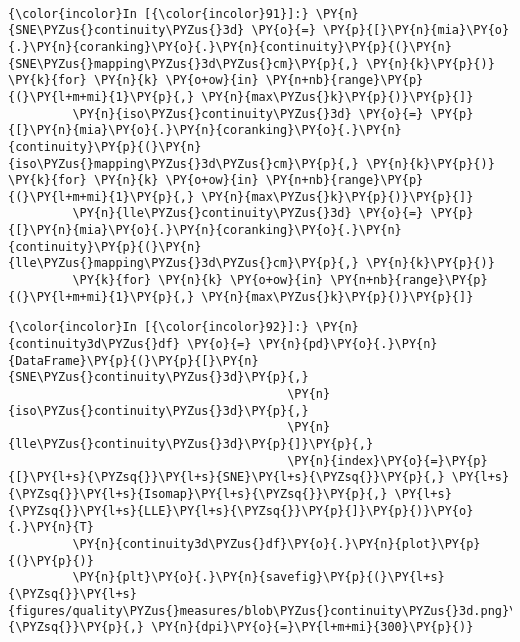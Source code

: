     \begin{center}
    \end{center}
    { \hspace*{\fill} \\}

    \begin{Verbatim}[commandchars=\\\{\}]
{\color{incolor}In [{\color{incolor}91}]:} \PY{n}{SNE\PYZus{}continuity\PYZus{}3d} \PY{o}{=} \PY{p}{[}\PY{n}{mia}\PY{o}{.}\PY{n}{coranking}\PY{o}{.}\PY{n}{continuity}\PY{p}{(}\PY{n}{SNE\PYZus{}mapping\PYZus{}3d\PYZus{}cm}\PY{p}{,} \PY{n}{k}\PY{p}{)} \PY{k}{for} \PY{n}{k} \PY{o+ow}{in} \PY{n+nb}{range}\PY{p}{(}\PY{l+m+mi}{1}\PY{p}{,} \PY{n}{max\PYZus{}k}\PY{p}{)}\PY{p}{]}
         \PY{n}{iso\PYZus{}continuity\PYZus{}3d} \PY{o}{=} \PY{p}{[}\PY{n}{mia}\PY{o}{.}\PY{n}{coranking}\PY{o}{.}\PY{n}{continuity}\PY{p}{(}\PY{n}{iso\PYZus{}mapping\PYZus{}3d\PYZus{}cm}\PY{p}{,} \PY{n}{k}\PY{p}{)} \PY{k}{for} \PY{n}{k} \PY{o+ow}{in} \PY{n+nb}{range}\PY{p}{(}\PY{l+m+mi}{1}\PY{p}{,} \PY{n}{max\PYZus{}k}\PY{p}{)}\PY{p}{]}
         \PY{n}{lle\PYZus{}continuity\PYZus{}3d} \PY{o}{=} \PY{p}{[}\PY{n}{mia}\PY{o}{.}\PY{n}{coranking}\PY{o}{.}\PY{n}{continuity}\PY{p}{(}\PY{n}{lle\PYZus{}mapping\PYZus{}3d\PYZus{}cm}\PY{p}{,} \PY{n}{k}\PY{p}{)}
         \PY{k}{for} \PY{n}{k} \PY{o+ow}{in} \PY{n+nb}{range}\PY{p}{(}\PY{l+m+mi}{1}\PY{p}{,} \PY{n}{max\PYZus{}k}\PY{p}{)}\PY{p}{]}
\end{Verbatim}

    \begin{Verbatim}[commandchars=\\\{\}]
{\color{incolor}In [{\color{incolor}92}]:} \PY{n}{continuity3d\PYZus{}df} \PY{o}{=} \PY{n}{pd}\PY{o}{.}\PY{n}{DataFrame}\PY{p}{(}\PY{p}{[}\PY{n}{SNE\PYZus{}continuity\PYZus{}3d}\PY{p}{,}
                                       \PY{n}{iso\PYZus{}continuity\PYZus{}3d}\PY{p}{,}
                                       \PY{n}{lle\PYZus{}continuity\PYZus{}3d}\PY{p}{]}\PY{p}{,}
                                       \PY{n}{index}\PY{o}{=}\PY{p}{[}\PY{l+s}{\PYZsq{}}\PY{l+s}{SNE}\PY{l+s}{\PYZsq{}}\PY{p}{,} \PY{l+s}{\PYZsq{}}\PY{l+s}{Isomap}\PY{l+s}{\PYZsq{}}\PY{p}{,} \PY{l+s}{\PYZsq{}}\PY{l+s}{LLE}\PY{l+s}{\PYZsq{}}\PY{p}{]}\PY{p}{)}\PY{o}{.}\PY{n}{T}
         \PY{n}{continuity3d\PYZus{}df}\PY{o}{.}\PY{n}{plot}\PY{p}{(}\PY{p}{)}
         \PY{n}{plt}\PY{o}{.}\PY{n}{savefig}\PY{p}{(}\PY{l+s}{\PYZsq{}}\PY{l+s}{figures/quality\PYZus{}measures/blob\PYZus{}continuity\PYZus{}3d.png}\PY{l+s}{\PYZsq{}}\PY{p}{,} \PY{n}{dpi}\PY{o}{=}\PY{l+m+mi}{300}\PY{p}{)}
\end{Verbatim}

